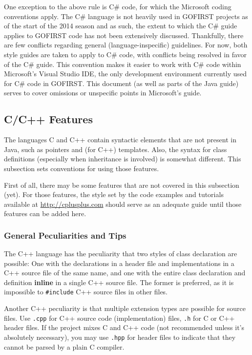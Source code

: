 \documentclass[12pt]{article}
\newcommand{\code}[1]{\texttt{#1}}
\newcommand{\textdef}[1]{\textbf{#1}}
\begin{document}
One exception to the above rule is C\# code, for which the Microsoft coding conventions \cite{csguide} apply. The C\# language is not heavily used in GOFIRST projects as of the start of the 2014 season and as such, the extent to which the C\# guide applies to GOFIRST code has not been extensively discussed. Thankfully, there are few conflicts regarding general (language-inspecific) guidelines. For now, both style guides are taken to apply to C\# code, with conflicts being resolved in favor of the C\# guide. This convention makes it easier to work with C\# code within Microsoft's Visual Studio IDE, the only development environment currently used for C\# code in GOFIRST. This document (as well as parts of the Java guide) serves to cover omissions or unspecific points in Microsoft's guide.

\subsection{C/C++ Features}
\label{sec:ccpp-special}
The languages C and C++ contain syntactic elements that are not present in Java, such as pointers and (for C++) templates. Also, the syntax for class definitions (especially when inheritance is involved) is somewhat different. This subsection sets conventions for using those features.

First of all, there may be some features that are not covered in this subsection (yet). For those features, the style set by the code examples and tutorials available at \url{http://cplusplus.com} should serve as an adequate guide until those features can be added here.

\subsubsection{General Peculiarities and Tips}
The C++ language has the peculiarity that two styles of class declaration are possible: One with the declarations in a header file and implementations in a C++ source file of the same name, and one with the entire class declaration and definition \textdef{inline} in a single C++ source file. The former is preferred, as it is impossible to \code{\#include} C++ source files in other files.

Another C++ peculiarity is that multiple extension types are possible for source files. Use \code{.cpp} for C++ source code (implementation) files, \code{.h} for C or C++ header files. If the project mixes C and C++ code (not recommended unless it's absolutely necessary), you may use \code{.hpp} for header files to indicate that they cannot be parsed by a plain C compiler.
\end{document}
